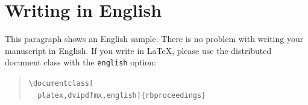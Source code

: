 \documentclass[platex,dvipdfmx]{rbproceedings}
\newcommand{\code}[1]{\texttt{#1}}
\begin{document}
\section{Writing in English}
This paragraph shows an English sample.
There is no problem with writing your manuscript in English.
If you write in LaTeX, please use the distributed document class with the \code{english} option:
\begin{quote}
\verb|\documentclass[|\\
\verb|  platex,dvipdfmx,english]{rbproceedings}|
\end{quote}



\end{document}
